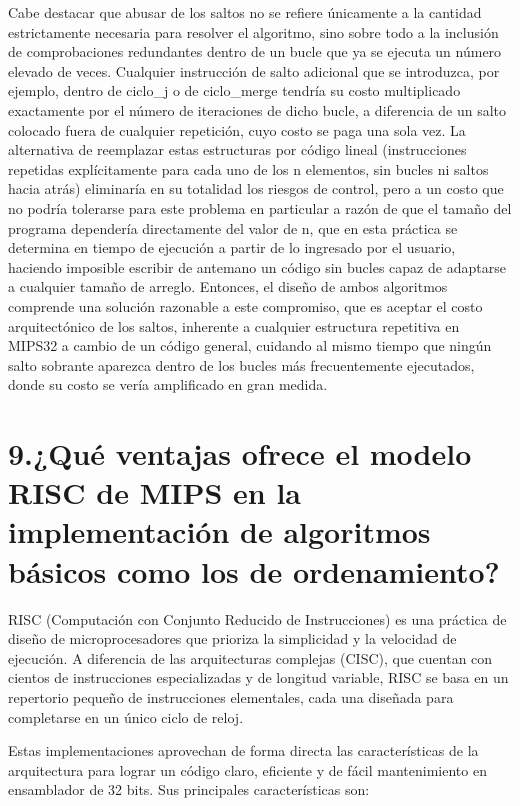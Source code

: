 \documentclass[12pt, letterpaper]{article}
\begin{document}
Cabe destacar que abusar de los saltos no se refiere únicamente a la cantidad estrictamente necesaria para resolver el algoritmo, sino sobre todo a la inclusión de comprobaciones redundantes dentro de un bucle que ya se ejecuta un número elevado de veces. Cualquier instrucción de salto adicional que se introduzca, por ejemplo, dentro de ciclo\_j o de ciclo\_merge tendría su costo multiplicado exactamente por el número de iteraciones de dicho bucle, a diferencia de un salto colocado fuera de cualquier repetición, cuyo costo se paga una sola vez. La alternativa de reemplazar estas estructuras por código lineal (instrucciones repetidas explícitamente para cada uno de los n elementos, sin bucles ni saltos hacia atrás) eliminaría en su totalidad los riesgos de control, pero a un costo que no podría tolerarse para este problema en particular a razón de que el tamaño del programa dependería directamente del valor de n, que en esta práctica se determina en tiempo de ejecución a partir de lo ingresado por el usuario, haciendo imposible escribir de antemano un código sin bucles capaz de adaptarse a cualquier tamaño de arreglo. Entonces, el diseño de ambos algoritmos comprende una solución razonable a este compromiso, que es aceptar el costo arquitectónico de los saltos, inherente a cualquier estructura repetitiva en MIPS32 a cambio de un código general, cuidando al mismo tiempo que ningún salto sobrante aparezca dentro de los bucles más frecuentemente ejecutados, donde su costo se vería amplificado en gran medida.\newpage

\section*{9.¿Qué ventajas ofrece el modelo RISC de MIPS en la implementación de algoritmos básicos como los de ordenamiento?}

RISC (Computación con Conjunto Reducido de Instrucciones) es una práctica de diseño de microprocesadores que prioriza la simplicidad y la velocidad de ejecución. A diferencia de las arquitecturas complejas (CISC), que cuentan con cientos de instrucciones especializadas y de longitud variable, RISC se basa en un repertorio pequeño de instrucciones elementales, cada una diseñada para completarse en un único ciclo de reloj. 

Estas implementaciones aprovechan de forma directa las características de la arquitectura para lograr un código claro, eficiente y de fácil mantenimiento en ensamblador de 32 bits. Sus principales características son:
\end{document}
